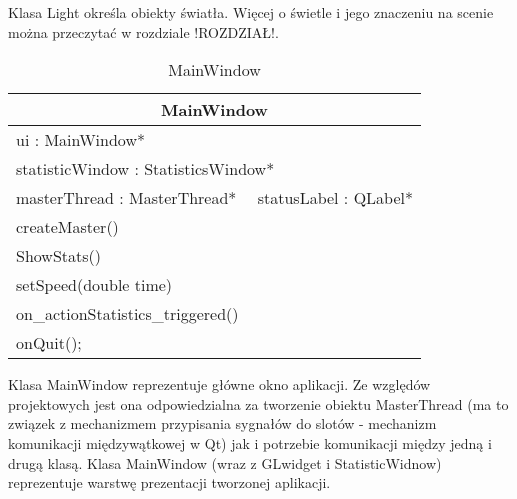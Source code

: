 Klasa Light określa obiekty światła. Więcej o świetle i jego znaczeniu na scenie można przeczytać w rozdziale !ROZDZIAŁ!.

\begin{longtable}{|p{16cm}|}
    \caption{MainWindow} \label{tab:MainWindow} \\ \hline
    \multicolumn{1}{|c|}{MainWindow} \\ \hline
    ui : MainWindow* \\
    statisticWindow : StatisticsWindow* \\
    masterThread : MasterThread* \ \
    statusLabel : QLabel* \\ \hline
    createMaster() \\
    ShowStats() \\
    setSpeed(double time) \\
    on\_actionStatistics\_triggered() \\
    onQuit(); \\ \hline
\end{longtable}

Klasa MainWindow reprezentuje główne okno aplikacji. Ze względów projektowych jest ona odpowiedzialna za tworzenie obiektu MasterThread (ma to związek z mechanizmem przypisania sygnałów do slotów - mechanizm komunikacji międzywątkowej w Qt) jak i potrzebie komunikacji między jedną i drugą klasą. Klasa MainWindow (wraz z GLwidget i StatisticWidnow) reprezentuje warstwę prezentacji tworzonej aplikacji.

